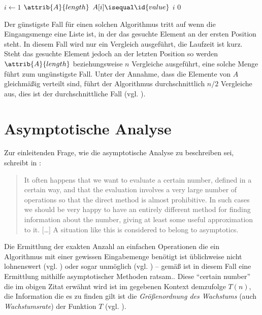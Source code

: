 \begin{codebox}
    \li \For $i \gets 1$ \To $\attrib{A}{length}$
    \li     \Do
                \If $A[i] \isequal \id{value}$
    \li             \Then
                        \Return $i$
                    \End
            \End
    \li \Return $0$
\end{codebox}

Der günstigste Fall für einen solchen Algorithmus tritt auf wenn die Eingangsmenge eine Liste ist, in der das gesuchte Element an der ersten Position steht. In diesem Fall wird nur ein Vergleich ausgeführt, die Laufzeit ist kurz. Steht das gesuchte Element jedoch an der letzten Position so werden $\attrib{A}{length}$ beziehungsweise $n$ Vergleiche ausgeführt, eine solche Menge führt zum ungünstigste Fall. Unter der Annahme, dass die Elemente von $A$ gleichmäßig verteilt sind, führt der Algorithmus durchschnittlich $n/2$ Vergleiche aus, dies ist der durchschnittliche Fall (vgl. \cite[59]{sha2011}).

\section{Asymptotische Analyse}
\label{sec:asymptotic-analysis}

Zur einleitenden Frage, wie die asymptotische Analyse zu beschreiben sei, schreibt \citeauthor{bru1958} in :

\blockquote[{\cite[1]{bru1958}}]{It often happens that we want to evaluate a certain number, defined in a certain way, and that the evaluation involves a very large number of operations so that the direct method is almost prohibitive. In such cases we should be very happy to have an entirely different method for finding information about the number, giving at least some useful approximation to it. [\ldots] A situation like this is considered to belong to asymptotics.}

Die Ermittlung der exakten Anzahl an einfachen Operationen die ein Algorithmus mit einer gewissen Eingabemenge benötigt ist üblichweise nicht lohnenswert (vgl. \cite[28]{hsr1997}) oder sogar unmöglich (vgl. \cite[37]{meh1984}) -- gemäß \citeauthor{bru1958} ist in diesem Fall eine Ermittlung mithilfe asymptotischer Methoden ratsam.. Diese \enquote{certain number} die im obigen Zitat erwähnt wird ist im gegebenen Kontext demzufolge $T(n)$, die Information die es zu finden gilt ist die \emph{Größenordnung des Wachstums} (auch \emph{Wachstumsrate}) der Funktion $T$ (vgl. \cite[63]{sha2011}).

